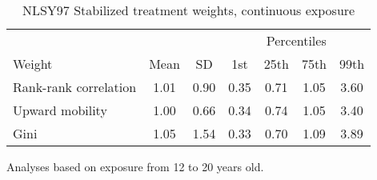 \begin{table}[htp]
\centering
\footnotesize
\setlength{\tabcolsep}{10pt}
\renewcommand{\arraystretch}{1}
\begin{threeparttable}
\centering
\caption{NLSY97 Stabilized treatment weights, continuous exposure}
\label{tab:ipt_weigths_z}
\begin{tabular}{lcccccc}
  \hline
\multicolumn{3}{c}{} & \multicolumn{4}{c}{Percentiles} \\
 \cmidrule{4-7}
Weight & Mean & SD & 1st & 25th & 75th & 99th \\
  \hline
Rank-rank correlation & 1.01 & 0.90 & 0.35 & 0.71 & 1.05 & 3.60 \\
  Upward mobility & 1.00 & 0.66 & 0.34 & 0.74 & 1.05 & 3.40 \\
  Gini & 1.05 & 1.54 & 0.33 & 0.70 & 1.09 & 3.89 \\
   \hline
\end{tabular}
\begin{tablenotes}
\footnotesize
\item Analyses based on exposure from 12 to 20 years old.
\end{tablenotes}
\end{threeparttable}
\end{table}
